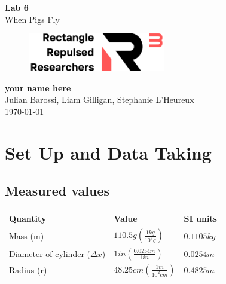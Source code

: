 \documentclass[11pt, letterpaper, includehead]{article}
\renewcommand{\arraystretch}{1.2}
\begin{document}
\begin{titlepage}
  \begin{center}
    \Huge{\textbf{Lab 6}}\\
    \Huge{When Pigs Fly}
    \vfill
    \begin{figure}[H] %
      \centering
      \includegraphics[width=6cm]{../logo.png}
    \end{figure}
    \large{\textbf{your name here}}\\
    \large{Julian Barossi, Liam Gilligan, Stephanie L'Heureux}\\
    \vspace{0.5cm}
    \normalsize
    \today
  \end{center}
\end{titlepage}

\tableofcontents
\pagebreak %

\pagestyle{fancy}
\fancyhead{}


\section{Set Up and Data Taking}


\renewcommand{\arraystretch}{2} 
\subsection{Measured values}
\begin{center}
  \begin{tabular}{|  m{5cm} | m{4cm} | m{3cm} | }
    \hline
    \textbf{Quantity} & \textbf{Value} & \textbf{SI units} \\
    \hline
    Mass  (m)  & $110.5g\left( \frac{1kg}{10^3g}\right)$ & $0.1105 kg$  \\
    \hline
    Diameter of cylinder ($\Delta x$) & $1in\left( \frac{0.0254m}{1in}\right)$ & $0.0254 m$  \\
    \hline
    Radius (r) & $48.25 cm \left( \frac{1m}{10^2cm}\right)$ & $0.4825 m$  \\
    \hline
  \end{tabular}
\end{center}
\renewcommand{\arraystretch}{1.5}
\end{document}
